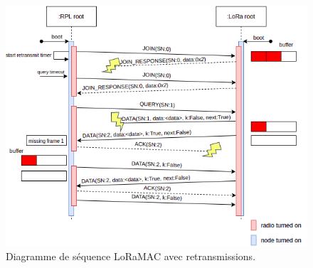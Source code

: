     \begin{figure}[H]
        \centering
        \includegraphics[scale=0.6]{res/pictures/loramac-sequence2.drawio.png}
        \caption{Diagramme de séquence LoRaMAC avec retransmissions.}
        \label{fig:archi-sequence2}
    \end{figure}


